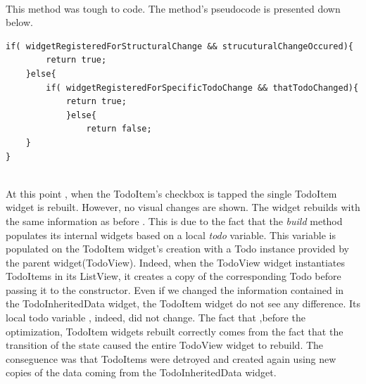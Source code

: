 \mbox{}\\
This method was tough to code. The method's pseudocode is presented down below. 
\mbox{}\\
\begin{code}
\mbox{}
\label{code:2.47}
\begin{verbatim}
if( widgetRegisteredForStructuralChange && strucuturalChangeOccured){
        return true;
    }else{
        if( widgetRegisteredForSpecificTodoChange && thatTodoChanged){
            return true;
            }else{
                return false;
    }
}
\end{verbatim}
\end{code}
\mbox{}\\
At this point , when the TodoItem’s checkbox is tapped the single TodoItem widget is rebuilt. However, no visual changes are shown. The widget rebuilds with the same information as before . This is due to the fact that the \textit{build} method populates its internal widgets based on a local \textit{todo} variable. This variable is populated on the TodoItem widget's creation with a Todo instance provided by the parent widget(TodoView). Indeed, when the TodoView widget instantiates TodoItems  in its ListView, it creates a copy of the corresponding Todo before passing it to the constructor. Even if we changed the information contained in the TodoInheritedData widget, the TodoItem widget do not see any difference.  Its local todo variable , indeed, did not change. The fact that ,before the optimization, TodoItem widgets rebuilt correctly comes from the fact that the transition of the state caused the entire TodoView widget to rebuild. The conseguence was that TodoItems were detroyed and created again using new copies of the data coming from the TodoInheritedData widget. \\
